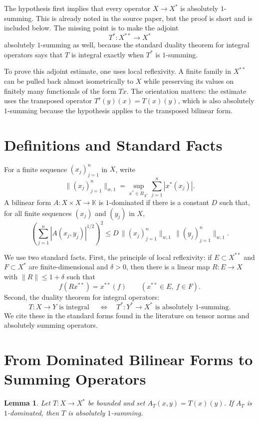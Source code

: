 \documentclass[11pt]{article}
\newtheorem{lemma}{Lemma}
\begin{document}
The hypothesis first implies that every operator \(X\to X^*\) is absolutely
\(1\)-summing. This is already noted in the source paper, but the proof is
short and is included below. The missing point is to make the adjoint
\[
T^*:X^{**}\to X^*
\]
absolutely \(1\)-summing as well, because the standard duality theorem for
integral operators says that \(T\) is integral exactly when \(T^*\) is
\(1\)-summing.

To prove this adjoint estimate, one uses local reflexivity. A finite family in
\(X^{**}\) can be pulled back almost isometrically to \(X\) while preserving its
values on finitely many functionals of the form \(Tx\). The orientation matters:
the estimate uses the transposed operator \(T^\tau(y)(x)=T(x)(y)\), which is
also absolutely \(1\)-summing because the hypothesis applies to the transposed
bilinear form.

\section*{Definitions and Standard Facts}

For a finite sequence \((x_j)_{j=1}^n\) in \(X\), write
\[
\|(x_j)_{j=1}^n\|_{w,1}
  =\sup_{x^*\in B_{X^*}}\sum_{j=1}^n |x^*(x_j)|.
\]
A bilinear form \(A:X\times X\to\mathbb K\) is \(1\)-dominated if there is a
constant \(D\) such that, for all finite sequences \((x_j)\) and \((y_j)\) in
\(X\),
\[
\left(\sum_{j=1}^n |A(x_j,y_j)|^{1/2}\right)^2
\le D\,\|(x_j)_{j=1}^n\|_{w,1}\,\|(y_j)_{j=1}^n\|_{w,1}.
\tag{1}
\]

We use two standard facts. First, the principle of local reflexivity: if
\(E\subset X^{**}\) and \(F\subset X^*\) are finite-dimensional and
\(\delta>0\), then there is a linear map \(R:E\to X\) with
\(\|R\|\le 1+\delta\) such that
\[
  f(Rx^{**})=x^{**}(f)\qquad(x^{**}\in E,\ f\in F).
\]
Second, the duality theorem for integral operators:
\[
  T:X\to Y \text{ is integral }
  \quad\Longleftrightarrow\quad
  T^*:Y^*\to X^* \text{ is absolutely }1\text{-summing}.
\tag{2}
\]
We cite these in the standard forms found in the literature on tensor norms
and absolutely summing operators.

\section*{From Dominated Bilinear Forms to Summing Operators}

\begin{lemma}
Let \(T:X\to X^*\) be bounded and set \(A_T(x,y)=T(x)(y)\). If \(A_T\) is
\(1\)-dominated, then \(T\) is absolutely \(1\)-summing.
\end{lemma}
\end{document}
